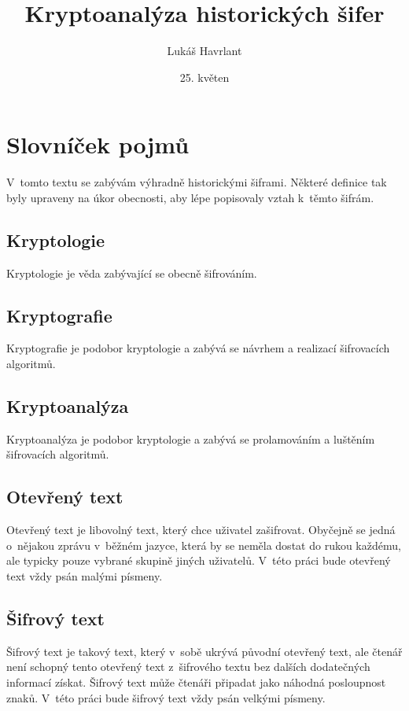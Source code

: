\documentclass[12pt]{article}
\title{Kryptoanalýza historických šifer}
\author{Lukáš Havrlant}
\date{25. květen}
\theoremstyle{definition}
\begin{document}


\maketitle
\newpage

\section{Slovníček pojmů}

V~tomto textu se zabývám výhradně historickými šiframi. Některé definice tak byly upraveny na úkor obecnosti, aby lépe popisovaly vztah k~těmto šifrám. 

\subsection{Kryptologie}
Kryptologie je věda zabývající se obecně šifrováním. 

\subsection{Kryptografie}
Kryptografie je podobor kryptologie a zabývá se návrhem a realizací šifrovacích algoritmů.

\subsection{Kryptoanalýza}
Kryptoanalýza je podobor kryptologie a zabývá se prolamováním a luštěním šifrovacích algoritmů. 

\subsection{Otevřený text}
Otevřený text je libovolný text, který chce uživatel zašifrovat. Obyčejně se jedná o~nějakou zprávu v~běžném jazyce, která by se neměla dostat do rukou každému, ale typicky pouze vybrané skupině jiných uživatelů. V~této práci bude otevřený text vždy psán malými písmeny.

\subsection{Šifrový text}
Šifrový text je takový text, který v~sobě ukrývá původní otevřený text, ale čtenář není schopný tento otevřený text z~šifrového textu bez dalších dodatečných informací získat. Šifrový text může čtenáři připadat jako náhodná posloupnost znaků. V~této práci bude šifrový text vždy psán velkými písmeny.
\end{document}

